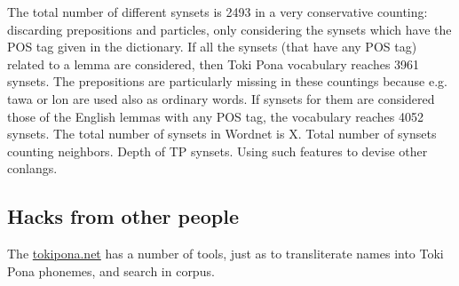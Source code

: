 \documentclass{article}
\begin{document}
The total number of different synsets is 2493 in a very conservative
counting: discarding prepositions and particles,
only considering the synsets which have the POS tag
given in the dictionary.
If all the synsets (that have any POS tag)
related to a lemma are considered, 
then Toki Pona vocabulary reaches 3961 synsets.
The prepositions are particularly missing in these
countings because e.g. tawa or lon are used also
as ordinary words.
If synsets for them are considered those of the English
lemmas with any POS tag, the vocabulary reaches 4052
synsets.
The total number of synsets in Wordnet is X.
Total number of synsets counting neighbors.
Depth of TP synsets.
Using such features to devise other conlangs.


\subsection{Hacks from other people}
The \url{tokipona.net} has a number of tools,
just as to transliterate names into Toki Pona phonemes,
and search in corpus.
\end{document}
